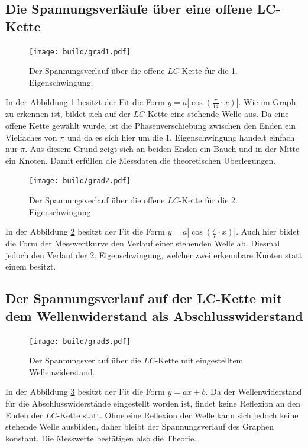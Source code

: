 \subsection{Die Spannungsverläufe über eine offene LC-Kette}

\begin{figure}[H]
	\centering
	\caption{Der Spannungsverlauf über die offene $LC$-Kette für die 1. Eigenschwingung.}
	\texttt{[image: build/grad1.pdf]}
	\label{fig:grad1}
\end{figure}

\hspace{1.8ex} In der Abbildung \ref{fig:grad1} besitzt der Fit die Form $y = a  |\cos(\frac{\pi}{14} \cdot x)|$. Wie im Graph zu erkennen ist, bildet sich auf der $LC$-Kette eine stehende Welle aus.
 Da eine offene Kette gewählt wurde, ist die Phasenverschiebung zwischen den Enden ein Vielfaches
  von $\pi$ und da es sich hier um die 1. Eigenschwingung handelt einfach nur $\pi$. Aus diesem Grund zeigt
 sich an beiden Enden ein Bauch und in der Mitte ein Knoten. Damit erfüllen die Messdaten die theoretischen Überlegungen.
\begin{figure}[H]
	\centering
	\caption{Der Spannungsverlauf über die offene $LC$-Kette für die 2. Eigenschwingung.}
	\texttt{[image: build/grad2.pdf]}
	\label{fig:grad2}
\end{figure}
In der Abbildung \ref{fig:grad2} besitzt der Fit die Form $y = a  |\cos(\frac{\pi}{7} \cdot x)|$. Auch hier bildet die Form der Messwertkurve den Verlauf einer stehenden Welle ab. Diesmal jedoch den Verlauf der 2. Eigenschwingung, welcher zwei erkennbare Knoten statt einem besitzt.

\subsection{Der Spannungsverlauf auf der LC-Kette mit dem Wellenwiderstand als Abschlusswiderstand}
\begin{figure}[H]
	\centering
	\caption{Der Spannungsverlauf über die $LC$-Kette mit eingestelltem Wellenwiderstand.}
	\texttt{[image: build/grad3.pdf]}
	\label{fig:grad3}
\end{figure}

In der Abbildung \ref{fig:grad3} besitzt der Fit die Form $y = a  x + b$. Da der Wellenwiderstand für die Abschlusswiderstände eingestellt worden ist, findet keine Reflexion an den Enden der $LC$-Kette statt. Ohne eine Reflexion der Welle kann sich jedoch keine stehende Welle ausbilden, daher bleibt der Spannungsverlauf des Graphen konstant. Die Messwerte bestätigen also die Theorie.
